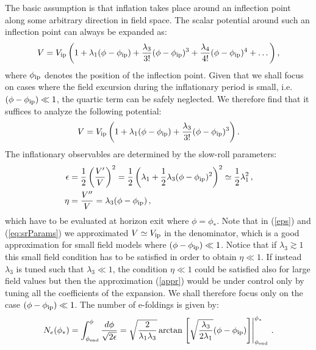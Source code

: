 \documentclass[12pt,a4paper]{book}
\begin{document}
The basic assumption is that inflation takes place around an inflection point along some arbitrary direction in field space. The scalar potential around such an inflection point can always be expanded as:
\begin{align}
V = V_{\rm ip} \left(1+ \lambda_1 (\phi - \phi_{\rm ip})+ \frac{\lambda_3}{3!} (\phi - \phi_{\rm ip})^3+\frac{\lambda_4}{4!} (\phi - \phi_{\rm ip})^4+\dots\right),
\end{align}
where $\phi_{\rm ip}$ denotes the position of the inflection point. Given that we shall focus on cases where the field excursion during the inflationary period is small, i.e. $(\phi - \phi_{\rm ip})\ll 1$, the quartic term can be safely neglected. We therefore find that it suffices to analyze the following potential:
\begin{align}
V = V_{\rm ip} \left(1+ \lambda_1 (\phi - \phi_{\rm ip}) + \frac{\lambda_3}{3!} (\phi - \phi_{\rm ip})^3\right).
\label{appr}
\end{align}
The inflationary observables are determined by the slow-roll parameters:
\begin{align}
\epsilon &= \frac{1}{2} \left(\frac{V'}{V}\right)^2 = \frac{1}{2} \left(\lambda_1 + \frac{1}{2} \lambda_3 (\phi - \phi_{\rm ip})^2\right)^2\simeq \frac{1}{2}\lambda_1^2\,,
\label{eps} \\
\eta &= \frac{V''}{V} = \lambda_3 (\phi - \phi_{\rm ip})\,,
\label{eq:srParams}
\end{align}
which have to be evaluated at horizon exit where $\phi=\phi_*$. Note that in (\ref{eps}) and (\ref{eq:srParams}) we approximated $V \simeq V_{\rm ip}$ in the denominator, which is a good approximation for small field models where $(\phi - \phi_{\rm ip})\ll 1$. Notice that if $\lambda_3\gtrsim 1$ this small field condition has to be satisfied in order to obtain $\eta\ll 1$. If instead $\lambda_3$ is tuned such that $\lambda_3\ll 1$, the condition $\eta\ll 1$ could be satisfied also for large field values but then the approximation (\ref{appr}) would be under control only by tuning all the coefficients of the expansion. We shall therefore focus only on the case $(\phi - \phi_{\rm ip})\ll 1$. The number of e-foldings is given by:
\begin{align} 
N_e(\phi_*) = \int_{\phi_{\rm end}}^{\phi} \frac{d \phi}{\sqrt{2 \epsilon}} = \sqrt{\frac{2}{\lambda_1 \lambda_3}} 
\arctan \left.\left[\sqrt{\frac{\lambda_3}{2\lambda_1}}(\phi - \phi_{\rm ip})\right]\right|_{\phi_{\rm end}}^{\phi_*}\,.
\label{Ne}
\end{align}
\end{document}
